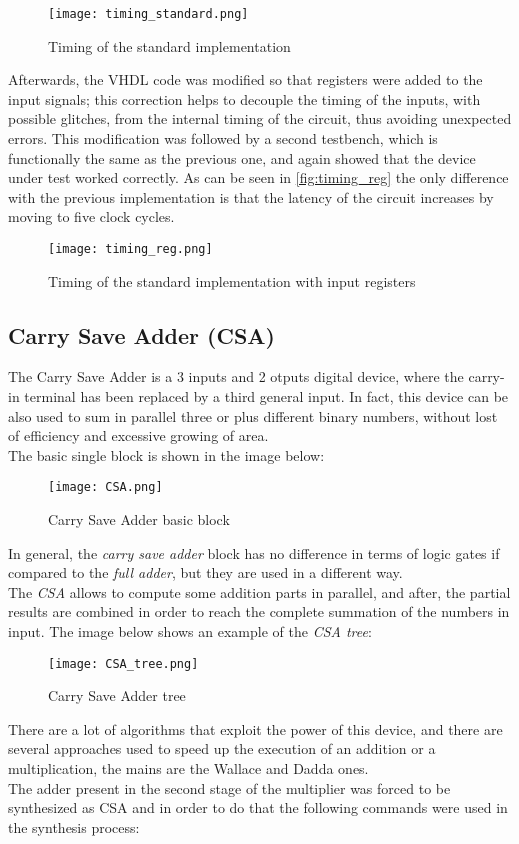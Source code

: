 \begin{figure}[h]
	\center
	\texttt{[image: timing\_standard.png]}
	\caption{Timing of the standard implementation}
	\label{fig:timing_standard}
\end{figure}

Afterwards, the VHDL code was modified so that registers were added to the input signals; this correction helps to decouple the timing of the inputs, with possible glitches, from the internal timing of the circuit, thus avoiding unexpected errors.
This modification was followed by a second testbench, which is functionally the same as the previous one, and again showed that the device under test worked correctly. As can be seen in \autoref{fig:timing_reg} the only difference with the previous implementation is that the latency of the circuit increases by moving to five clock cycles.

\begin{figure}[htbp!]
	\center
	\texttt{[image: timing\_reg.png]}
	\caption{Timing of the standard implementation with input registers}
	\label{fig:timing_reg}
\end{figure}



\subsection{Carry Save Adder (CSA)}
The Carry Save Adder is a 3 inputs and 2 otputs digital device, where the carry-in terminal has been replaced by a third general input. In fact, this device can be also used to sum in parallel three or plus different binary numbers, without lost of efficiency and excessive growing of area. \\
The basic single block is shown in the image below:

\begin{figure}[H]
	\center
	\texttt{[image: CSA.png]}
	\caption{Carry Save Adder basic block}
	\label{fig:CSA}
\end{figure}

\noindent In general, the \textit{carry save adder} block has no difference in terms of logic gates if compared to the \textit{full adder}, but they are used in a different way. \\
The \textit{CSA} allows to compute some addition parts in parallel, and after, the partial results are combined in order to reach the complete summation of the numbers in input. The image below shows an example of the \textit{CSA tree}:
\begin{figure}[H]
	\center
	\texttt{[image: CSA\_tree.png]}
	\caption{Carry Save Adder tree}
	\label{fig:CSA_tree}
\end{figure}
\noindent There are a lot of algorithms that exploit the power of this device, and there are several approaches used to speed up the execution of an addition or a multiplication, the mains are the Wallace and Dadda ones.
\\
The adder present in the second stage of the multiplier was forced to be synthesized as CSA and in order to do that the following commands were used in the synthesis process:

